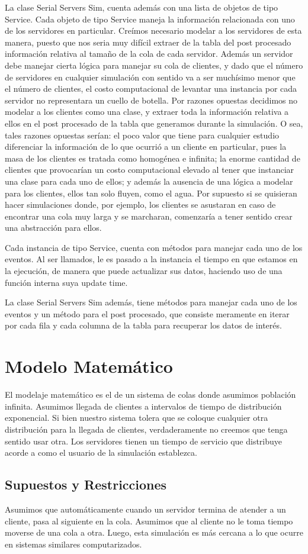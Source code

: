 \documentclass[12pt]{article}
\begin{document}
La clase Serial Servers Sim, cuenta además con una lista de objetos de tipo Service. Cada objeto de tipo Service maneja la información relacionada con uno de los servidores en particular. Creímos necesario modelar a los servidores de esta manera, puesto que nos seria muy difícil extraer de la tabla del post procesado información relativa al tamaño de la cola de cada servidor. Además un servidor debe manejar cierta lógica para manejar su cola de clientes, y dado que el número de servidores en cualquier simulación con sentido va a ser muchísimo menor que el número de clientes, el costo computacional de levantar una instancia por cada servidor no representara un cuello de botella. Por razones opuestas decidimos no modelar a los clientes como una clase, y extraer toda la información relativa a ellos en el post procesado de la tabla que generamos durante la simulación. O sea, tales razones opuestas serían: el poco valor que tiene para cualquier estudio diferenciar la información de lo que ocurrió a un cliente en particular, pues la masa de los clientes es tratada como homogénea e infinita; la enorme cantidad de clientes que provocarían un costo computacional elevado al tener que instanciar una clase para cada uno de ellos; y además la ausencia de una lógica a modelar para los clientes, ellos tan solo fluyen, como el agua. Por supuesto si se quisieran hacer simulaciones donde, por ejemplo, los clientes se asustaran en caso de encontrar una cola muy larga y se marcharan, comenzaría a tener sentido crear una abstracción para ellos.

Cada instancia de tipo Service, cuenta con métodos para manejar cada uno de los eventos. Al ser llamados, le es pasado a la instancia el tiempo en que estamos en la ejecución, de manera que puede actualizar sus datos, haciendo uso de una función interna suya update time.

La clase Serial Servers Sim además, tiene métodos para manejar cada uno de los eventos y un método para el post procesado, que consiste meramente en iterar por cada fila y cada columna de la tabla para recuperar los datos de interés.

\newpage
\section{Modelo Matemático}
El modelaje matemático es el de un sistema de colas donde asumimos población infinita. Asumimos llegada de clientes a intervalos de tiempo de distribución exponencial. Si bien nuestro sistema tolera que se coloque cualquier otra distribución para la llegada de clientes, verdaderamente no creemos que tenga sentido usar otra. Los servidores tienen un tiempo de servicio que distribuye acorde a como el usuario de la simulación establezca.

\subsection{Supuestos y Restricciones}
Asumimos que automáticamente cuando un servidor termina de atender a un cliente, pasa al siguiente en la cola.
Asumimos que al cliente no le toma tiempo moverse de una cola a otra.
Luego, esta simulación es más cercana a lo que ocurre en sistemas similares computarizados.
\end{document}
